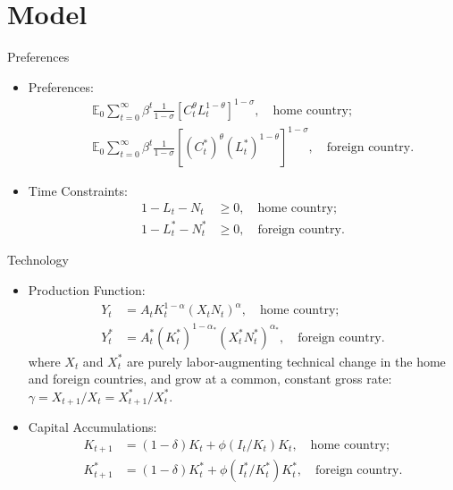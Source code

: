 \documentclass[10pt]{beamer}
\begin{document}
\section{Model}
\begin{frame}{Preferences}
\begin{itemize}
  \item Preferences:
  \begin{eqnarray}
  &&\mathbb{E}_0\sum_{t=0}^{\infty}{\beta}^t \frac{1}{1-\sigma} [C_t^\theta L_t^{1-\theta}]^{1-\sigma}, \quad \text{home country;}\\
  &&\mathbb{E}_0\sum_{t=0}^{\infty}{\beta}^t \frac{1}{1-\sigma} [(C_t^*)^\theta (L_t^*)^{1-\theta}]^{1-\sigma},\quad \text{foreign country.}
  \end{eqnarray}
  \item Time Constraints:
  \begin{align}
  1-L_t-N_t &\geq  0,\quad \text{home country;}\\
  1-L_t^*-N_t^* & \geq  0,\quad \text{foreign country.}
  \end{align}
\end{itemize}
\end{frame}

\begin{frame}{Technology}
\begin{itemize}
  \item Production Function:
  \begin{align}
  Y_t &= A_t K_t^{1-\alpha}(X_tN_t)^\alpha,\quad \text{home country;} \\
  Y_t^* &= A_t^* (K_t^*)^{1-\alpha_*}(X_t^*N_t^*)^{\alpha_*},\quad \text{foreign country.}
  \end{align}
  where $X_t$ and $X_t^*$ are purely \alert{labor-augmenting} technical change in the home and foreign countries, and grow at a common, constant gross rate: $\gamma=X_{t+1}/X_t=X_{t+1}^*/X_t^*$.
  \item Capital Accumulations:
  \begin{align}
  K_{t+1}&=(1-\delta)K_t+\phi(I_t/K_t)K_t,\quad \text{home country;} \\
  K_{t+1}^*&=(1-\delta)K_t^*+\phi(I_t^*/K_t^*)K_t^*, \quad \text{foreign country.}
  \end{align}
\end{itemize}
\end{frame}
\end{document}
